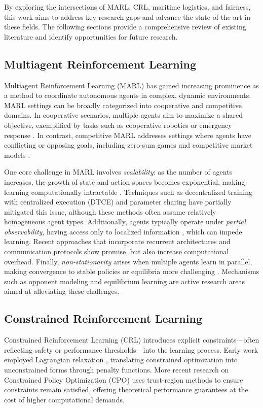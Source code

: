 By exploring the intersections of MARL, CRL, maritime logistics, and fairness, this work aims to address key research gaps and advance the state of the art in these fields. The following sections provide a comprehensive review of existing literature and identify opportunities for future research.

\subsection{Multiagent Reinforcement Learning}
Multiagent Reinforcement Learning (MARL) has gained increasing prominence as a method to coordinate autonomous agents in complex, dynamic environments. MARL settings can be broadly categorized into cooperative and competitive domains. In cooperative scenarios, multiple agents aim to maximize a shared objective, exemplified by tasks such as cooperative robotics or emergency response \cite{panait2005cooperative,foerster2018learning}. In contrast, competitive MARL addresses settings where agents have conflicting or opposing goals, including zero-sum games and competitive market models \cite{lowe2017multi,silver2017mastering}.

One core challenge in MARL involves \emph{scalability}: as the number of agents increases, the growth of state and action spaces becomes exponential, making learning computationally intractable \cite{hernandez2019survey}. Techniques such as decentralized training with centralized execution (DTCE) \cite{oliehoek2008optimal} and parameter sharing \cite{gupta2017cooperative} have partially mitigated this issue, although these methods often assume relatively homogeneous agent types. Additionally, agents typically operate under \emph{partial observability}, having access only to localized information \cite{foerster2016learning}, which can impede learning. Recent approaches that incorporate recurrent architectures \cite{hausknecht2015deep} and communication protocols \cite{sukhbaatar2016learning} show promise, but also increase computational overhead. Finally, \emph{non-stationarity} arises when multiple agents learn in parallel, making convergence to stable policies or equilibria more challenging \cite{zhang2021multi}. Mechanisms such as opponent modeling \cite{albrecht2018autonomous} and equilibrium learning \cite{shou2022multi} are active research areas aimed at alleviating these challenges.

\subsection{Constrained Reinforcement Learning}
Constrained Reinforcement Learning (CRL) introduces explicit constraints—often reflecting safety or performance thresholds—into the learning process. Early work employed Lagrangian relaxation \cite{altman1999constrained}, translating constrained optimization into unconstrained forms through penalty functions. More recent research on Constrained Policy Optimization (CPO) \cite{achiam2017constrained} uses trust-region methods to ensure constraints remain satisfied, offering theoretical performance guarantees at the cost of higher computational demands.

